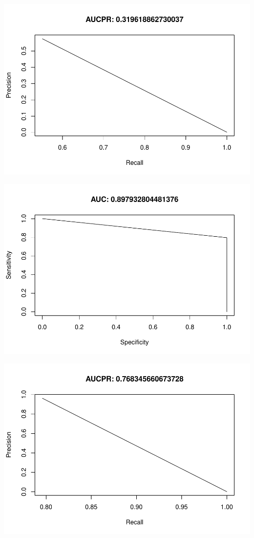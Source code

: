 \documentclass[]{article}
\begin{document}
\begin{center}\includegraphics{Credit_Card_Fraud_Detection_Project_Report_files/figure-latex/unnamed-chunk-25-15} \end{center}

\begin{center}\includegraphics{Credit_Card_Fraud_Detection_Project_Report_files/figure-latex/unnamed-chunk-25-16} \end{center}

\begin{center}\includegraphics{Credit_Card_Fraud_Detection_Project_Report_files/figure-latex/unnamed-chunk-25-17} \end{center}
\end{document}
